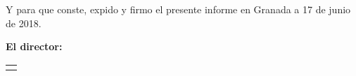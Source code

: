 \vspace{0.5cm}

Y para que conste, expido y firmo el presente informe en Granada a 17 de junio de 2018.

\vspace{1cm}

\textbf{El director:}

\vspace{5cm}


\begin{table}
	\begin{minipage}{.4\textwidth}
		\centering
		\begin{tabular}{c}
			\\ \hline 
			\textbf{\myProf}\\
		\end{tabular}
	\end{minipage}
\end{table}